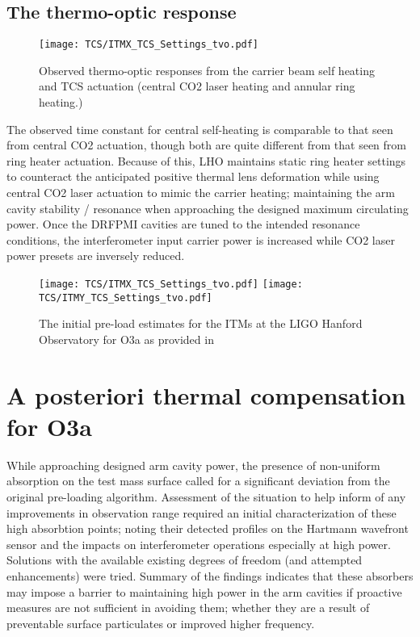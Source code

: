 \subsection{The thermo-optic response}
\begin{figure}[!h]
  \centering
  \begin{subcaptiongroup}
	  \texttt{[image: TCS/ITMX\_TCS\_Settings\_tvo.pdf]}
	  \label{ITMX_TCS}
  \end{subcaptiongroup}
  \captionsetup{subrefformat=parens}
  \hfill
  \caption{Observed thermo-optic responses from the carrier beam self heating and TCS actuation (central CO2 laser heating and annular ring heating.)} 
\label{fig:thermooptic_response}
\end{figure}
The observed time constant for central self-heating is comparable to that seen from central CO2 actuation, though both are quite different from that seen from ring heater actuation. Because of this, LHO maintains static ring heater settings to counteract the anticipated positive thermal lens deformation while using central CO2 laser actuation to mimic the carrier heating; maintaining the arm cavity stability / resonance when approaching the designed maximum circulating power. Once the DRFPMI cavities are tuned to the intended resonance conditions, the interferometer input carrier power is increased while CO2 laser power presets are inversely reduced. 

\begin{figure}[!h]
  \centering
  \begin{subcaptiongroup}
	  \texttt{[image: TCS/ITMX\_TCS\_Settings\_tvo.pdf]}
	  \label{ITMX_TCS}
	  \texttt{[image: TCS/ITMY\_TCS\_Settings\_tvo.pdf]}
	  \label{ITMY_TCS}
  \end{subcaptiongroup}
  \captionsetup{subrefformat=parens}
  \hfill
  \caption{The initial pre-load estimates for the ITMs at the LIGO Hanford Observatory for O3a as provided in \cite{tvo}} 
  \label{fig:O3_preload_tvo}
\end{figure}


\section{A posteriori thermal compensation for O3a}
While approaching designed arm cavity power, the presence of non-uniform absorption on the test mass surface called for a significant deviation from the original pre-loading algorithm. Assessment of the situation to help inform of any improvements in observation range required an initial characterization of these high absorbtion points; noting their detected profiles on the Hartmann wavefront sensor and the impacts on interferometer operations especially at high power. Solutions with the available existing degrees of freedom (and attempted enhancements) were tried. Summary of the findings indicates that these absorbers may impose a barrier to maintaining high power in the arm cavities if proactive measures are not sufficient in avoiding them; whether they are a result of preventable surface particulates or improved higher frequency.  

